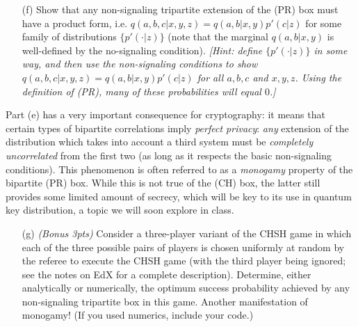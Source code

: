 \documentclass[12pt]{article}
\begin{document}
\begin{enumerate}
\begin{enumerate}
\item[(f)] Show that any non-signaling tripartite extension of the (PR) box must have a product form, i.e. $q(a,b,c|x,y,z) = q(a,b|x,y)p'(c|z)$ for some family of distributions $\{p'(\cdot|z)\}$ (note that the marginal $q(a,b|x,y)$ is well-defined by the no-signaling condition). \emph{[Hint: define $\{p'(\cdot|z)\}$ in some way, and then use the non-signaling conditions to show $q(a,b,c|x,y,z) = q(a,b|x,y)p'(c|z)$ for all $a,b,c$ and $x,y,z$. Using the definition of (PR), many of these probabilities will equal $0$.]}
\end{enumerate}
Part (e) has a very important consequence for cryptography: it means that certain types of bipartite correlations imply \emph{perfect privacy}: \emph{any} extension of the distribution which takes into account a third system must be \emph{completely uncorrelated} from the first two (as long as it respects the basic non-signaling conditions). This phenomenon is often referred to as a \emph{monogamy} property of the bipartite (PR) box. While this is not true of the (CH) box, the latter still provides some limited amount of secrecy, which will be key to its use in quantum key distribution, a topic we will soon explore in class. 
\begin{enumerate}
\item[(g)] \emph{(Bonus 3pts)} Consider a three-player variant of the CHSH game in which each of the three possible pairs of players is chosen uniformly at random by the referee to execute the CHSH game (with the third player being ignored; see the notes on EdX for a complete description). Determine, either analytically or numerically, the optimum success probability achieved by any non-signaling tripartite box in this game. Another manifestation of monogamy! (If you used numerics, include your code.)
\end{enumerate}




\end{enumerate}
\end{document}
